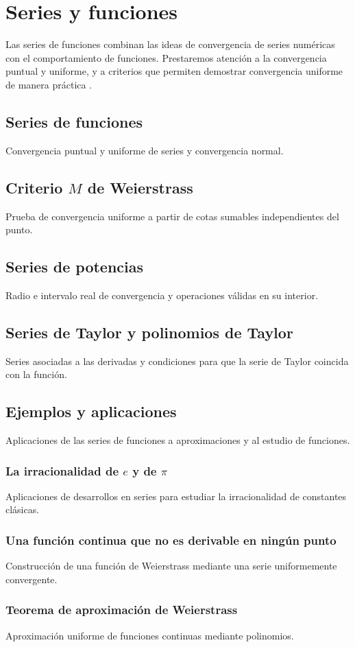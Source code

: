 \chapter{Series y funciones}
\label{cap:series-funciones}

Las series de funciones combinan las ideas de convergencia de series numéricas con el comportamiento de funciones. Prestaremos atención a la convergencia puntual y uniforme, y a criterios que permiten demostrar convergencia uniforme de manera práctica \cite{abbott2015,rudin1976}.

\section{Series de funciones}
Convergencia puntual y uniforme de series y convergencia normal.

\section{Criterio \texorpdfstring{$M$}{M} de Weierstrass}
Prueba de convergencia uniforme a partir de cotas sumables independientes del punto.

\section{Series de potencias}
Radio e intervalo real de convergencia y operaciones válidas en su interior.

\section{Series de Taylor y polinomios de Taylor}
Series asociadas a las derivadas y condiciones para que la serie de Taylor coincida con la función.

\section{Ejemplos y aplicaciones}
Aplicaciones de las series de funciones a aproximaciones y al estudio de funciones.

\subsection{La irracionalidad de \texorpdfstring{$e$}{e} y de \texorpdfstring{$\pi$}{pi}}
Aplicaciones de desarrollos en series para estudiar la irracionalidad de constantes clásicas.

\subsection{Una función continua que no es derivable en ningún punto}
Construcción de una función de Weierstrass mediante una serie uniformemente convergente.

\subsection{Teorema de aproximación de Weierstrass}
Aproximación uniforme de funciones continuas mediante polinomios.
